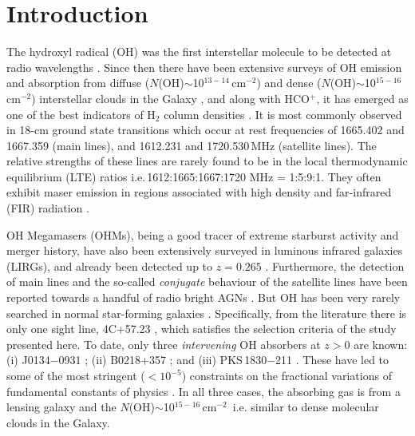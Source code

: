 \documentclass[iop,apjl,numberedappendix,appendixfloats,twocolappendix,revtex4]{emulateapj}
\newcommand{\cmsq}{cm$^{-2}$}
\begin{document}


\section{Introduction} 
\label{sec:intro}  

The hydroxyl radical (OH) was the first interstellar molecule to be detected at radio wavelengths \citep[][]{Weinreb63}.  
Since then there have been extensive surveys of OH emission and absorption from diffuse ($N$(OH)$\sim$10$^{13-14}$\,\cmsq) and 
dense ($N$(OH)$\sim$10$^{15-16}$\,\cmsq) interstellar clouds in the Galaxy \citep[e.g.][]{Dickey81, Wannier93, Li18}, 
and along with HCO$^+$, it has emerged as one of the best indicators of H$_2$ column densities 
\citep[][]{Liszt99}.  It is most commonly observed in 18-cm 
ground state transitions which occur at rest frequencies of 1665.402 and 1667.359 (main lines), and 
1612.231 and  1720.530\,MHz (satellite lines).
The relative strengths of these lines are rarely found to be in the 
local thermodynamic equilibrium (LTE) ratios i.e.\,1612:1665:1667:1720 MHz = 1:5:9:1. They often exhibit maser emission 
in regions associated with high density and far-infrared (FIR) radiation \citep[][]{Cohen95}.   

OH Megamasers (OHMs), being a good tracer of extreme starburst activity and merger history, have also been extensively 
surveyed in luminous infrared galaxies (LIRGs), and already been detected up to $z = 0.265$ \citep[e.g.][]{Baan89, Darling02sur, Fernandez10}.  
Furthermore, the detection of main lines and the so-called {\it conjugate} behaviour of the satellite lines have been 
reported towards a handful of radio bright AGNs \citep[e.g.][]{vanLangevelde95, Darling04}. 
But OH has been very rarely searched in normal star-forming galaxies \citep[e.g.][]{Borthakur11, Zwaan15}. 
Specifically, from the literature there is only one sight line, 4C+57.23 \citep[][]{Zwaan15}, which satisfies the selection criteria 
of the study presented here. 
To date, only three {\it intervening } OH absorbers at $z>0$ are known: 
(i) J0134$-$0931 \citep[$z = 0.765$;][]{Kanekar05}; (ii) B0218+357 \citep[$z = 0.685$;][]{Kanekar03oh}; and 
(iii) PKS\,1830$-$211 \citep[$z = 0.886$;][]{Chengalur99}.  These have led to some of the most stringent ($<10^{-5}$) 
constraints on the fractional variations of fundamental constants of physics \citep[][]{Uzan11}. 
In all three cases, the absorbing gas is from a lensing galaxy and the $N$(OH)$\sim$10$^{15-16}$\,\cmsq\ i.e. similar to dense molecular clouds 
in the Galaxy. 
\end{document}

